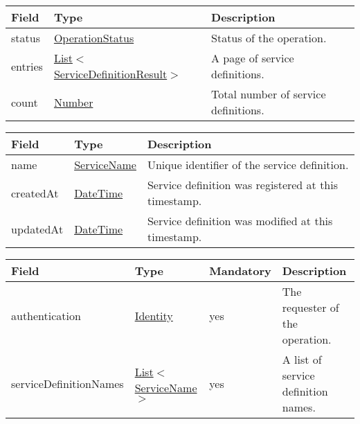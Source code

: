\documentclass[a4paper]{arrowhead}
\newcommand{\pref}[1]{{\textcolor{ArrowheadGrey}{\hyperref[sec:model:primitives:#1]{#1}}}}
\begin{document}
\clearpage


\begin{table}[ht!]
\begin{tabularx}{\textwidth}{| p{2.5cm} | p{5cm} | X |} \hline
\rowcolor{gray!33} Field & Type      & Description \\ \hline
status & \pref{OperationStatus} & Status of the operation. \\ \hline
entries & \pref{List}$<$\hyperref[sec:model:ServiceDefinitionResult]{ServiceDefinitionResult}$>$ & A page of service definitions. \\ \hline
count & \pref{Number} & Total number of service definitions. \\ \hline
\end{tabularx}
\end{table}

 
\begin{table}[ht!]
\begin{tabularx}{\textwidth}{| p{2.5cm} | p{2.5cm} | X |} \hline
\rowcolor{gray!33} Field & Type      & Description \\ \hline
name & \pref{ServiceName} & Unique identifier of the service definition. \\ \hline
createdAt & \pref{DateTime} & Service definition was registered at this timestamp. \\ \hline
updatedAt & \pref{DateTime} & Service definition was modified at this timestamp. \\ \hline
\end{tabularx}
\end{table}

 
\begin{table}[ht!]
\begin{tabularx}{\textwidth}{| p{3.7cm} | p{3.5cm} | p{2cm} | X |} \hline
\rowcolor{gray!33} Field & Type & Mandatory & Description \\ \hline
authentication & \hyperref[sec:model:Identity]{Identity} & yes & The requester of the operation. \\ \hline
serviceDefinitionNames & \pref{List}$<$\pref{ServiceName}$>$ & yes & A list of service definition names. \\ \hline
\end{tabularx}
\end{table}
\end{document}

